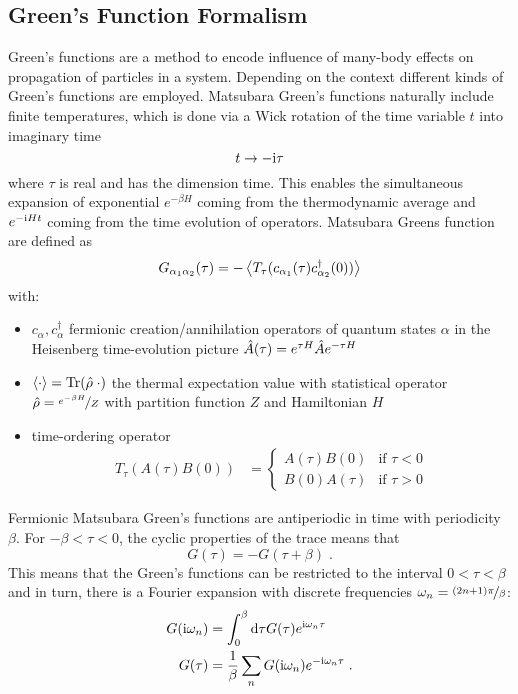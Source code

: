 \documentclass[../main.tex]{subfiles}
\begin{document}
\subsection*{Green's Function Formalism}

Green's functions are a method to encode influence of many-body effects on propagation of particles in a system.
Depending on the context different kinds of Green's functions are employed.
Matsubara Green's functions naturally include finite temperatures, which is done via a Wick rotation of the time variable \(t\) into imaginary time
\begin{equation}
	t \to -\mathrm{i} \tau
\end{equation}
where \(\tau\) is real and has the dimension time.
This enables the simultaneous expansion of exponential \(e^{-\beta H}\) coming from the thermodynamic average and \(e^{-\mathrm{i} H t}\) coming from the time evolution of operators.
Matsubara Greens function are defined as
\begin{equation}
	G_{\alpha_1 \alpha_2} (\tau) = - \Braket{T_{\tau} (c_{\alpha_1}(\tau) c^{\dagger}_{\alpha_2} (0))}
\end{equation}
with:
\begin{itemize}
	\item \(c_{\alpha}, c^{\dagger}_{\alpha}\) fermionic creation/annihilation operators of quantum states \(\alpha\) in the Heisenberg time-evolution picture \(\hat{A} (\tau) = e^{\tau H} \hat{A} e^{-\tau H}\)
	\item \(\braket{\cdot} = \operatorname{Tr}(\hat{\rho}\; \cdot)\) the thermal expectation value with statistical operator \(\hat{\rho} = \nicefrac{e^{-\beta H}}{Z}\) with partition function \(Z\) and Hamiltonian \(H\)
	\item time-ordering operator
	\begin{align}
		T_{\tau} (A(\tau) B(0)) &= \begin{cases}
			A (\tau) B(0) & \text{if } \tau < 0 \\
			B(0) A (\tau) & \text{if } \tau > 0
		\end{cases}
	\end{align}
\end{itemize}
Fermionic Matsubara Green's functions are antiperiodic in time with periodicity \(\beta\).
For \(-\beta < \tau < 0\), the cyclic properties of the trace means that
\begin{equation}
	G (\tau) = - G (\tau + \beta) \;.
\end{equation}
This means that the Green's functions can be restricted to the interval \(0 < \tau < \beta\) and in turn, there is a Fourier expansion with discrete frequencies \(\omega_n = \nicefrac{(2n + 1)\pi}{\beta}\):
\begin{align}
	G (\iu \omega_n) &= \int_{0}^{\beta} \odif{\tau} G (\tau) e^{\iu \omega_n \tau} \\
	G (\tau) &= \frac{1}{\beta} \sum_{n} G(\iu \omega_n) e^{-\iu \omega_n \tau} \;.
\end{align}
\end{document}

